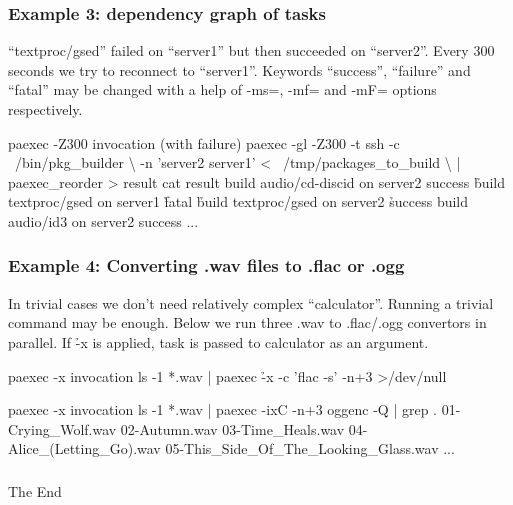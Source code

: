 \documentclass[hyperref={colorlinks=true}]{beamer}
\begin{document}
\begin{frame}[fragile]
  \frametitle{Example 3: dependency graph of tasks}
``textproc/gsed'' failed on ``server1'' but then succeeded on ``server2''.
Every 300 seconds we try to reconnect to ``server1''. Keywords ``success'',
``failure'' and ``fatal'' may be changed with a help of -ms=, -mf= and
-mF= options respectively.
  \begin{block}{}
      \begin{CodeSmall}{paexec -Z300 invocation (with failure)}
\prompt{\$} paexec -gl -Z300 -t ssh -c ~/bin/pkg_builder \textbackslash
      -n 'server2 server1' < ~/tmp/packages_to_build \textbackslash
      | paexec_reorder > result
\prompt{\$} cat result
build audio/cd-discid on server2
success
\h{build textproc/gsed on server1}
\h{fatal}
\h{build textproc/gsed on server2}
\h{success}
build audio/id3 on server2
success
...
\prompt{\$}
      \end{CodeSmall}
  \end{block}
\end{frame}

\begin{frame}[fragile]
  \frametitle{Example 4: Converting .wav files to .flac or .ogg}
In trivial cases we don't need relatively complex ``calculator''.
Running a trivial command may be enough.
Below we run three .wav to .flac/.ogg convertors in parallel.
If \h{-x} is applied, task is passed to calculator as an argument.
\begin{block}{}
  \begin{CodeSmall}{paexec -x invocation}
\prompt{\$} ls -1 *.wav | paexec \h{-x} -c 'flac -s' -n+3 >/dev/null
\prompt{\$}
  \end{CodeSmall}
\end{block}
\begin{block}{}
  \begin{CodeSmall}{paexec -x invocation}
\prompt{\$} ls -1 *.wav | paexec -ixC -n+3 oggenc -Q | grep .
01-Crying_Wolf.wav
02-Autumn.wav
03-Time_Heals.wav
04-Alice_(Letting_Go).wav
05-This_Side_Of_The_Looking_Glass.wav
...
\prompt{\$}
  \end{CodeSmall}
\end{block}
\end{frame}

\begin{frame}[fragile]
  \frametitle{}
  \begin{center}
    \huge
    The End
  \end{center}
\end{frame}

\end{document}

